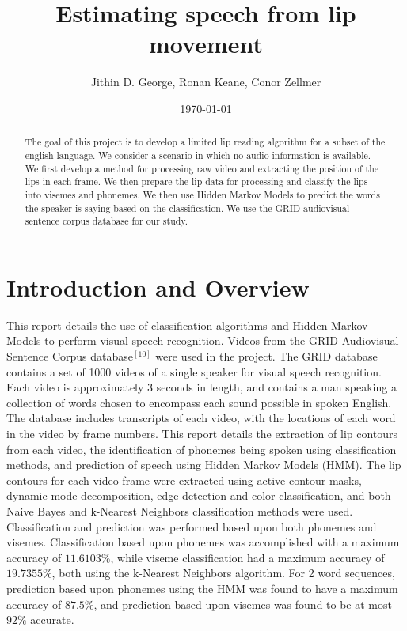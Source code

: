 \documentclass[a4paper,11pt]{article}
\title{Estimating speech from lip movement}
\author{Jithin D. George, Ronan Keane, Conor Zellmer}
\date{\today}
\begin{document}
\maketitle

\begin{abstract}
The goal of this project is to develop a limited lip reading algorithm for a subset of the english language. We consider a scenario in which no audio information is available. We first develop a method for processing raw video and extracting the position of the lips in each frame. We then prepare the lip data for processing and classify the lips into visemes and phonemes. We then use Hidden Markov Models to predict the words the speaker is saying based on  the classification. We use the GRID audiovisual sentence corpus database for our study. 
\end{abstract}

\section{Introduction and Overview}
\label{sec:introduction}

This report details the use of classification algorithms and Hidden Markov Models to perform visual speech recognition.  Videos from the GRID Audiovisual Sentence Corpus database$^{[10]}$ were used in the project.  The GRID database contains a set of 1000 videos of a single speaker for visual speech recognition.  Each video is approximately 3 seconds in length, and contains a man speaking a collection of words chosen to encompass each sound possible in spoken English.  The database includes transcripts of each video, with the locations of each word in the video by frame numbers.  This report details the extraction of lip contours from each video, the identification of phonemes being spoken using classification methods, and prediction of speech using Hidden Markov Models (HMM).  The lip contours for each video frame were extracted using active contour masks, dynamic mode decomposition, edge detection and color classification, and both Naive Bayes and k-Nearest Neighbors classification methods were used.  Classification and prediction was performed based upon both phonemes and visemes.  Classification based upon phonemes was accomplished with a maximum accuracy of $11.6103\%$, while viseme classification had a maximum accuracy of $19.7355\%$, both using the k-Nearest Neighbors algorithm.  For 2 word sequences, prediction based upon phonemes using the HMM was found to have a maximum accuracy of $87.5\%$, and prediction based upon visemes was found to be at most $92\%$ accurate.  
\end{document}

